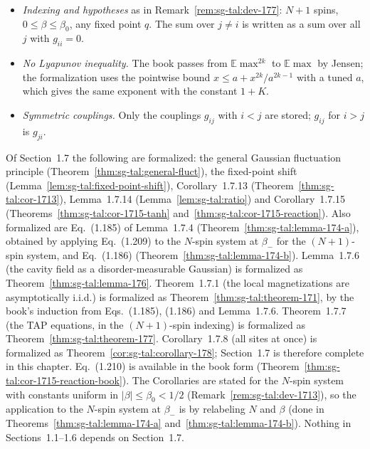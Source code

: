 \begin{remark}
\label{rem:sg-tal:dev-178}
\begin{itemize}
\item \emph{Indexing and hypotheses} as in Remark~\ref{rem:sg-tal:dev-177}: $N+1$ spins, $0\le\beta\le\beta_0$, any fixed point $q$.  The sum over $j\ne i$ is written as a sum over all $j$ with $g_{ii}=0$.
\item \emph{No Lyapunov inequality.}  The book passes from $\mathbb E\max^{2k}$ to $\mathbb E\max$ by Jensen; the formalization uses the pointwise bound $x\le a+x^{2k}/a^{2k-1}$ with a tuned $a$, which gives the same exponent with the constant $1+K$.
\item \emph{Symmetric couplings.}  Only the couplings $g_{ij}$ with $i<j$ are stored; $g_{ij}$ for $i>j$ is $g_{ji}$.
\end{itemize}
\end{remark}

\begin{remark}
\label{rem:sg-tal:remaining-17}
Of Section~1.7 the following are formalized: the general Gaussian fluctuation principle (Theorem~\ref{thm:sg-tal:general-fluct}), the fixed-point shift (Lemma~\ref{lem:sg-tal:fixed-point-shift}),
Corollary~1.7.13 (Theorem~\ref{thm:sg-tal:cor-1713}), Lemma~1.7.14 (Lemma~\ref{lem:sg-tal:ratio}) and Corollary~1.7.15 (Theorems~\ref{thm:sg-tal:cor-1715-tanh} and~\ref{thm:sg-tal:cor-1715-reaction}).
Also formalized are Eq.~(1.185) of Lemma~1.7.4 (Theorem~\ref{thm:sg-tal:lemma-174-a}), obtained by applying Eq.~(1.209) to the $N$-spin system at $\beta_-$ for the $(N+1)$-spin system, and Eq.~(1.186) (Theorem~\ref{thm:sg-tal:lemma-174-b}).
Lemma~1.7.6 (the cavity field as a disorder-measurable Gaussian) is formalized as Theorem~\ref{thm:sg-tal:lemma-176}.
Theorem~1.7.1 (the local magnetizations are asymptotically i.i.d.) is formalized as Theorem~\ref{thm:sg-tal:theorem-171}, by the book's induction from Eqs.~(1.185), (1.186) and Lemma~1.7.6.
Theorem~1.7.7 (the TAP equations, in the $(N+1)$-spin indexing) is formalized as Theorem~\ref{thm:sg-tal:theorem-177}.
Corollary~1.7.8 (all sites at once) is formalized as Theorem~\ref{cor:sg-tal:corollary-178}; Section~1.7 is therefore complete in this chapter.
Eq.~(1.210) is available in the book form (Theorem~\ref{thm:sg-tal:cor-1715-reaction-book}).  The Corollaries are stated for the $N$-spin system with constants uniform in $|\beta|\le\beta_0<1/2$ (Remark~\ref{rem:sg-tal:dev-1713}), so the application to the $N$-spin system at $\beta_-$ is by relabeling $N$ and $\beta$ (done in Theorems~\ref{thm:sg-tal:lemma-174-a} and~\ref{thm:sg-tal:lemma-174-b}).
Nothing in Sections~1.1--1.6 depends on Section~1.7.
\end{remark}


